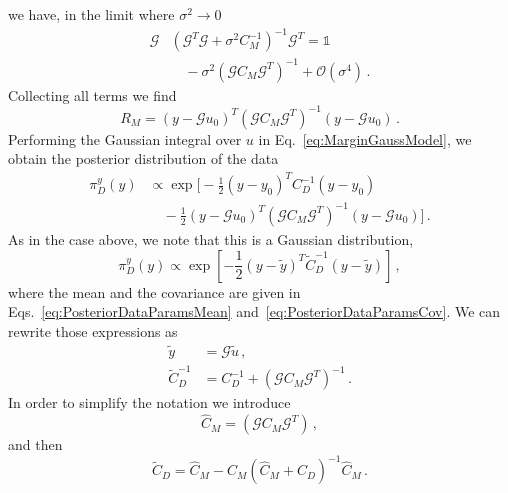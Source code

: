 we have, in the limit where $\sigma^2 \to 0$
\begin{align}
    \label{eq:QuadraticYTerm}
    \mathcal{G} &\left(\mathcal{G}^T \mathcal{G} + \sigma^2 C_M^{-1}\right)^{-1} 
    \mathcal{G}^T = 
    \mathds{1}  \nonumber \\ 
    & \quad- \sigma^2 \left(\mathcal{G} C_M \mathcal{G}^T\right)^{-1} + 
    \mathcal{O}(\sigma^4)\, .
\end{align}
Collecting all terms we find
\begin{equation}
    \label{eq:RMAfterLimit}
    R_M = \left(y - \mathcal{G} u_0\right)^T 
        \left(\mathcal{G} C_M \mathcal{G}^T\right)^{-1}
        \left(y- \mathcal{G} u_0\right)\, .
\end{equation}
Performing the Gaussian integral over $u$ in Eq.~\ref{eq:MarginGaussModel}, we
obtain the posterior distribution of the data
\begin{align}
    \label{eq:PosteriorDataDistr}
    \pi_D^y(y)& \propto 
    \exp\Big[-\frac12 \left(y-y_0\right)^T C_D^{-1} \left(y - y_0\right) \nonumber \\
    &\quad -\frac12 \left(y - \mathcal{G} u_0\right)^T 
    \left(\mathcal{G} C_M \mathcal{G}^T\right)^{-1}
    \left(y - \mathcal{G} u_0\right)
    \Big]\, .
\end{align}
As in the case above, we note that this is a Gaussian distribution,
\begin{equation}
    \label{eq:PosteriorDataDistrGauss}
    \pi_D^{y}(y) \propto
    \exp \left[
        -\frac12 \left(y - \tilde{y}\right)^T
        \tilde{C}_D^{-1} 
        \left(y - \tilde{y}\right)
    \right]\, ,
\end{equation}
where the mean and the covariance are given in
Eqs.~\ref{eq:PosteriorDataParamsMean} and~\ref{eq:PosteriorDataParamsCov}. We
can rewrite those expressions as
\begin{align}
    \tilde{y} &= \mathcal{G} \tilde{u} \, , \\
    \tilde{C}_D^{-1} &=
        C_D^{-1} + \left(\mathcal{G} C_M \mathcal{G}^T\right)^{-1}\, .
\end{align}
In order to simplify the notation we introduce
\begin{equation}
    \hat{C}_M = \left(\mathcal{G} C_M \mathcal{G}^T\right)\, ,
\end{equation}
and then
\begin{equation}
    \tilde{C}_D = \hat{C}_M
    - \hat{C}_M \left(\hat{C}_M + C_D \right)^{-1} 
    \hat{C}_M\, .
\end{equation}